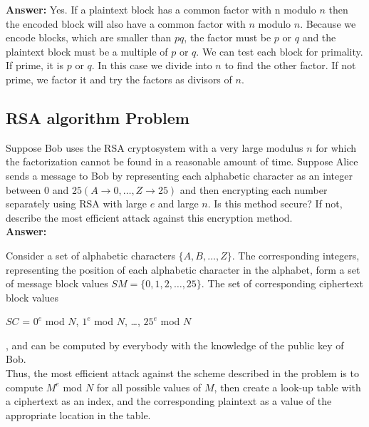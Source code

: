 \documentclass[paper=a4, fontsize=11pt]{scrartcl} %
\numberwithin{equation}{section} %
\numberwithin{figure}{section} %
\numberwithin{table}{section} %
\begin{document}
 \textbf{Answer:}
 Yes. If a plaintext block has a common factor with n modulo $n$ then the encoded block will also have a common factor with $n$ modulo $n$. Because we encode blocks, which are smaller than $pq$, the factor must be $p$ or $q$ and the plaintext block must be a multiple of $p$ or $q$. We can test each block for primality. If prime, it is $p$ or $q$. In this case we divide into $n$ to find the other factor. If not prime, we factor it and try the factors as divisors of $n$.


 \subsection{RSA algorithm Problem \uppercase\expandafter{}}

 Suppose Bob uses the RSA cryptosystem with a very large modulus $n$ for which the factorization cannot be found in a reasonable amount of time. Suppose Alice sends a message to Bob by representing each alphabetic character as an integer between $0$ and $25(A\rightarrow0,\ldots, Z\rightarrow25)$ and then encrypting each number separately using RSA with large $e$ and large $n$. Is this method secure? If not, describe the most efficient attack against this encryption method.\\

 \textbf{Answer:}

 Consider a set of alphabetic characters $\{A, B,\ldots, Z\}$. The corresponding integers, representing the position of each alphabetic character in the alphabet, form a set of message block values $SM = \{0, 1, 2,\ldots, 25\}$. The set of corresponding ciphertext block values \\
  \centerline{$SC$ = {$0^{e}$ mod $N$, $1^{e}$ mod $N$, \ldots, $25^{e}$ mod $N$}},
 and can be computed by everybody with the knowledge of the public key of Bob.\\
  Thus, the most efficient attack against the scheme described in the problem is to compute $M^{e}$ mod $N$ for all possible values of $M$, then create a look-up table with a ciphertext as an index, and the corresponding plaintext as a value of the appropriate location in the table.
\end{document}
